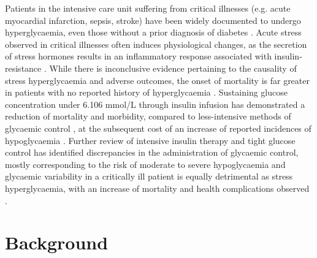 \documentclass[nomenclature, english, bibtex]{kththesis}
\newcommand*{\generalExpl}[1]{\todo[inline]{#1}}
\newcommand*{\sweExpl}[1]{\todo[inline, backgroundcolor=kth-lightblue40]{#1}}  %
\begin{document}
Patients in the intensive care unit suffering from critical illnesses (e.g. acute myocardial infarction, sepsis, stroke) have been widely documented to undergo hyperglycaemia, even those without a prior diagnosis of diabetes \cite{dungan_stress_2009}. Acute stress observed in critical illnesses often induces physiological changes, as the secretion of stress hormones results in an inflammatory response associated with insulin-resistance \cite{paolisso_hyperglycemia_2021} \cite{song_relationship_2025} \cite{lang_insulin-mediated_1990} \cite{andrews_glucocorticoids_1999} \cite{shangraw_differentiation_1989} \cite{heise_simulated_1998}. While there is inconclusive evidence pertaining to the causality of stress hyperglycaemia and adverse outcomes, the onset of mortality is far greater in patients with no reported history of hyperglycaemia \cite{dungan_stress_2009} \cite{song_relationship_2025}. Sustaining glucose concentration under 6.106 mmol/L through insulin infusion has demonstrated a reduction of mortality and morbidity, compared to less-intensive methods of glycaemic control \cite{berghe_intensive_2001}, at the subsequent cost of an increase of reported incidences of hypoglycaemia \cite{brunkhorst_intensive_2008}. Further review of intensive insulin therapy and tight glucose control has identified discrepancies in the administration of glycaemic control, mostly corresponding to the risk of moderate to severe hypoglycaemia and glycaemic variability in a critically ill patient is equally detrimental as stress hyperglycaemia, with an increase of mortality and health complications observed \cite{brunkhorst_intensive_2008} \cite{nice-sugar_study_investigators_hypoglycemia_2012} \cite{evans_surviving_2021}. 

\section{Background}
\label{sec:background}

\end{document}
